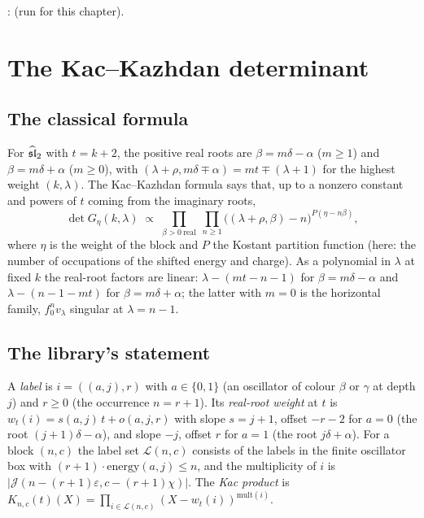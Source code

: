 \begin{status}
\allowbreak{}\allowbreak{}\allowbreak{}\allowbreak{}\allowbreak{}\allowbreak{}: \lean{[propext, Classical.}\allowbreak{}\allowbreak\lean{sound]}
(run for this chapter).
\end{status}
\section{The Kac--Kazhdan determinant}\label{l08:sec:kac}

\subsection{The classical formula}

For $\widehat{\mathfrak{sl}}_2$ with $t = k+2$, the positive real roots are $\beta = m\delta-\alpha$ ($m\ge1$) and $\beta = m\delta+\alpha$
($m\ge0$), with $(\lambda+\rho,m\delta\mp\alpha) = mt\mp(\lambda+1)$ for the highest weight $(k,\lambda)$. The
Kac--Kazhdan formula says that, up to a nonzero constant and powers of $t$ coming from the imaginary
roots,
\begin{equation}\label{l08:eq:KK}
  \det G_{\eta}(k,\lambda) \;\propto\; \prod_{\beta>0\ \mathrm{real}}\ \prod_{n\ge1}
  \bigl((\lambda+\rho,\beta) - n\bigr)^{P(\eta-n\beta)},
\end{equation}
where $\eta$ is the weight of the block and $P$ the Kostant partition function (here: the number of
occupations of the shifted energy and charge). As a polynomial in $\lambda$ at fixed $k$ the real-root
factors are linear: $\lambda - (mt-n-1)$ for $\beta = m\delta-\alpha$ and $\lambda - (n-1-mt)$ for $\beta = m\delta+\alpha$; the
latter with $m=0$ is the horizontal family, $f_0^nv_\lambda$ singular at $\lambda = n-1$.

\subsection{The library's statement}

\begin{definition}\label{l08:def:kacprod}
A \emph{label} is $i = ((a,j),r)$ with $a\in\{0,1\}$ (an oscillator of colour $\beta$ or $\gamma$ at depth $j$) and
$r\ge0$ (the occurrence $n = r+1$). Its \emph{real-root weight} at $t$ is
$w_t(i) = s(a,j)\,t + o(a,j,r)$ with slope $s = j+1$, offset $-r-2$ for $a=0$ (the root $(j+1)\delta-\alpha$), and slope
$-j$, offset $r$ for $a=1$ (the root $j\delta+\alpha$). For a block $(n,c)$ the label set $\mathcal L(n,c)$ consists of
the labels in the finite oscillator box with $(r+1)\cdot\mathrm{energy}(a,j)\le n$, and the multiplicity of $i$ is
$|\mathcal J(n - (r+1)\varepsilon, c - (r+1)\chi)|$. The \emph{Kac product} is
$K_{n,c}(t)(X) = \prod_{i\in\mathcal L(n,c)}(X - w_t(i))^{\mathrm{mult}(i)}$.
\end{definition}

